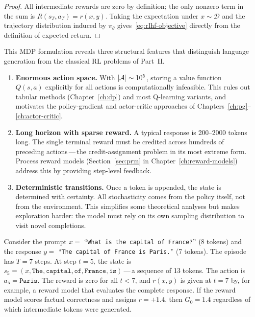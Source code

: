 \begin{proof}
All intermediate rewards are zero by definition; the only nonzero term in the sum is $R(s_T, a_T) = r(x, y)$. Taking the expectation under $x \sim \mathcal{D}$ and the trajectory distribution induced by $\pi_\theta$ gives~\eqref{eq:rlhf-objective} directly from the definition of expected return.
\end{proof}

This MDP formulation reveals three structural features that distinguish language generation from the classical RL problems of Part~II.

\begin{remark}
\label{rem:lm-mdp-features}
\begin{enumerate}[leftmargin=*]
  \item \textbf{Enormous action space.} With $|\mathcal{A}| \sim 10^5$, storing a value function $Q(s, a)$ explicitly for all actions is computationally infeasible. This rules out tabular methods (Chapter~\ref{ch:dp}) and most Q-learning variants, and motivates the policy-gradient and actor-critic approaches of Chapters~\ref{ch:pg}--\ref{ch:actor-critic}.
  \item \textbf{Long horizon with sparse reward.} A typical response is 200--2000 tokens long. The single terminal reward must be credited across hundreds of preceding actions\,---\,the credit-assignment problem in its most extreme form. Process reward models (Section~\ref{sec:prm} in Chapter~\ref{ch:reward-models}) address this by providing step-level feedback.
  \item \textbf{Deterministic transitions.} Once a token is appended, the state is determined with certainty. All stochasticity comes from the policy itself, not from the environment. This simplifies some theoretical analyses but makes exploration harder: the model must rely on its own sampling distribution to visit novel completions.
\end{enumerate}
\end{remark}

\begin{example}
\label{ex:token-mdp-example}
Consider the prompt $x = $ ``\texttt{What is the capital of France?}'' (8 tokens) and the response $y = $ ``\texttt{The capital of France is Paris.}'' (7 tokens). The episode has $T = 7$ steps. At step $t = 5$, the state is $s_5 = (x, \texttt{The}, \texttt{capital}, \texttt{of}, \texttt{France}, \texttt{is})$\,---\,a sequence of 13 tokens. The action is $a_5 = \texttt{Paris}$. The reward is zero for all $t < 7$, and $r(x, y)$ is given at $t = 7$ by, for example, a reward model that evaluates the complete response. If the reward model scores factual correctness and assigns $r = +1.4$, then $G_0 = 1.4$ regardless of which intermediate tokens were generated.
\end{example}

